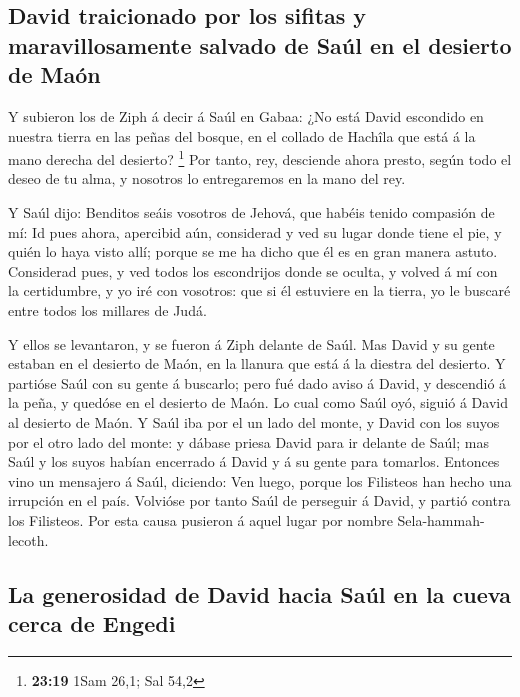 \hypertarget{david-traicionado-por-los-sifitas-y-maravillosamente-salvado-de-sauxfal-en-el-desierto-de-mauxf3n}{%
\subsection{David traicionado por los sifitas y maravillosamente salvado
de Saúl en el desierto de
Maón}\label{david-traicionado-por-los-sifitas-y-maravillosamente-salvado-de-sauxfal-en-el-desierto-de-mauxf3n}}

 Y subieron los de Ziph á decir á Saúl en Gabaa: ¿No está
David escondido en nuestra tierra en las peñas del bosque, en el collado
de Hachîla que está á la mano derecha del desierto? \footnote{\textbf{23:19}
  1Sam 26,1; Sal 54,2}  Por tanto, rey, desciende ahora
presto, según todo el deseo de tu alma, y nosotros lo entregaremos en la
mano del rey.

 Y Saúl dijo: Benditos seáis vosotros de Jehová, que habéis
tenido compasión de mí:  Id pues ahora, apercibid aún,
considerad y ved su lugar donde tiene el pie, y quién lo haya visto
allí; porque se me ha dicho que él es en gran manera astuto.
 Considerad pues, y ved todos los escondrijos donde se
oculta, y volved á mí con la certidumbre, y yo iré con vosotros: que si
él estuviere en la tierra, yo le buscaré entre todos los millares de
Judá.

 Y ellos se levantaron, y se fueron á Ziph delante de Saúl.
Mas David y su gente estaban en el desierto de Maón, en la llanura que
está á la diestra del desierto.  Y partióse Saúl con su
gente á buscarlo; pero fué dado aviso á David, y descendió á la peña, y
quedóse en el desierto de Maón. Lo cual como Saúl oyó, siguió á David al
desierto de Maón.  Y Saúl iba por el un lado del monte, y
David con los suyos por el otro lado del monte: y dábase priesa David
para ir delante de Saúl; mas Saúl y los suyos habían encerrado á David y
á su gente para tomarlos.  Entonces vino un mensajero á
Saúl, diciendo: Ven luego, porque los Filisteos han hecho una irrupción
en el país.  Volvióse por tanto Saúl de perseguir á David,
y partió contra los Filisteos. Por esta causa pusieron á aquel lugar por
nombre Sela-hammah-lecoth. 

\hypertarget{la-generosidad-de-david-hacia-sauxfal-en-la-cueva-cerca-de-engedi}{%
\subsection{La generosidad de David hacia Saúl en la cueva cerca de
Engedi}\label{la-generosidad-de-david-hacia-sauxfal-en-la-cueva-cerca-de-engedi}}

